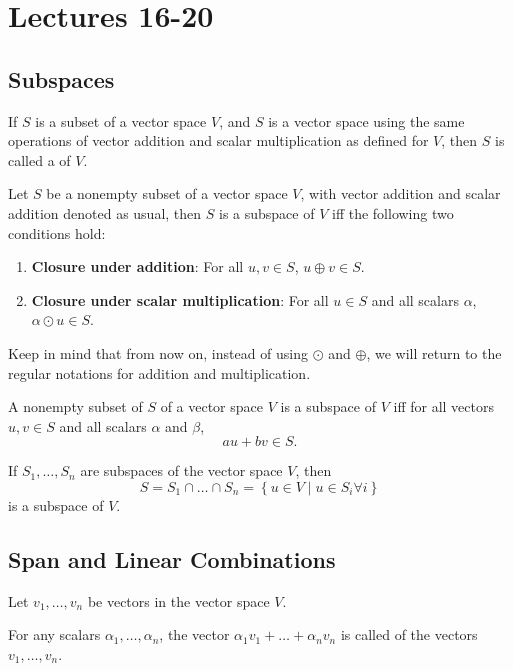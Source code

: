 \section{Lectures 16-20}
\subsection{Subspaces}
\begin{definition}
  If $S$ is a subset of a vector space $V$, and $S$ is a vector space using the same operations of vector 
  addition and scalar multiplication as defined for $V$, then $S$ is called a  of $V$.
\end{definition}

\begin{theorem}
  Let $S$ be a nonempty subset of a vector space $V$, with vector addition and scalar addition denoted as usual,
  then $S$ is a subspace of $V$ iff the following two conditions hold:
  \begin{enumerate}[(1)]
    \item \textbf{Closure under addition}: For all $u, v \in S$, $u \oplus v \in S$.
    \item \textbf{Closure under scalar multiplication}: For all $u \in S$ and all scalars $\alpha$, $\alpha \odot u \in S$.
  \end{enumerate}
\end{theorem}

Keep in mind that from now on, instead of using $\odot$ and $\oplus$, we will return to the regular notations
for addition and multiplication.

\begin{corollary}
  A nonempty subset of $S$ of a vector space $V$ is a subspace of $V$ iff for all vectors $u, v \in S$ 
  and all scalars $\alpha$ and $\beta$,
  \begin{equation*}
    au + bv \in S.
  \end{equation*}
\end{corollary}

\begin{theorem}
  If $S_{1}, \dots, S_{n}$ are subspaces of the vector space $V$, then 
  \begin{equation*}
    S = S_{1} \cap \dots \cap S_{n} = \left\{u \in V \mid u \in S_{i} \forall i\right\}
  \end{equation*}
  is a subspace of $V$.
\end{theorem}

\subsection{Span and Linear Combinations}
\begin{definition}
  Let $v_{1}, \dots, v_{n}$ be vectors in the vector space $V$.

  For any scalars $\alpha_{1}, \dots, \alpha_{n}$, the vector $\alpha_{1}v_{1} + \dots + \alpha_{n}v_{n}$ 
  is called  of the vectors $v_{1}, \dots, v_{n}$.
\end{definition}

